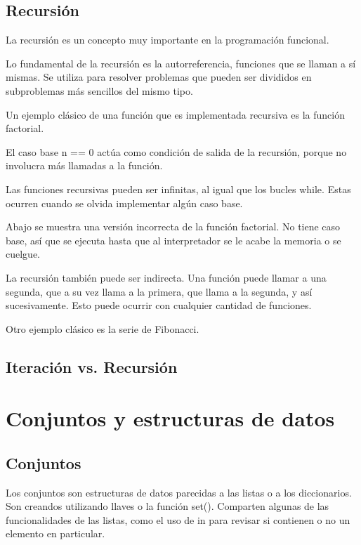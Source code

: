 \documentclass{report}
\begin{document}

\section{Recursión}

La recursión es un concepto muy importante en la programación funcional.

Lo fundamental de la recursión es la autorreferencia, funciones que se llaman a sí mismas. Se utiliza para resolver problemas que pueden ser divididos en subproblemas más sencillos del mismo tipo.

Un ejemplo clásico de una función que es implementada recursiva es la función factorial.


El caso base n == 0 actúa como condición de salida de la recursión, porque no involucra más llamadas a la función.

Las funciones recursivas pueden ser infinitas, al igual que los bucles while. Estas ocurren cuando se olvida implementar algún caso base.

Abajo se muestra una versión incorrecta de la función factorial. No tiene caso base, así que se ejecuta hasta que al interpretador se le acabe la memoria o se cuelgue.


La recursión también puede ser indirecta. Una función puede llamar a una segunda, que a su vez llama a la primera, que llama a la segunda, y así sucesivamente. Esto puede ocurrir con cualquier cantidad de funciones.


Otro ejemplo clásico es la serie de Fibonacci.


\section{Iteración vs. Recursión}

\clearpage\chapter{Conjuntos y estructuras de datos}

\section{Conjuntos}

Los conjuntos son estructuras de datos parecidas a las listas o a los diccionarios. Son creandos utilizando llaves o la función set(). Comparten algunas de las funcionalidades de las listas, como el uso de in para revisar si contienen o no un elemento en particular.
\end{document}
